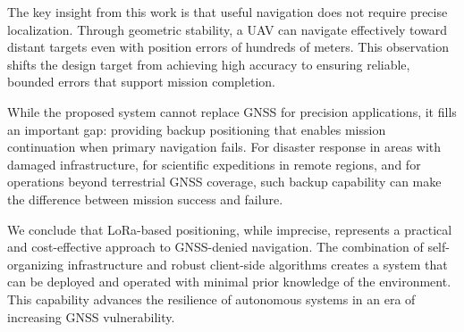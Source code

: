 \documentclass[master,final,11pt]{iscs-thesis}
\begin{document}
The key insight from this work is that useful navigation does not require precise localization.
Through geometric stability, a UAV can navigate effectively toward distant targets even with position errors of hundreds of meters.
This observation shifts the design target from achieving high accuracy to ensuring reliable, bounded errors that support mission completion.

While the proposed system cannot replace GNSS for precision applications, it fills an important gap: providing backup positioning that enables mission continuation when primary navigation fails.
For disaster response in areas with damaged infrastructure, for scientific expeditions in remote regions, and for operations beyond terrestrial GNSS coverage, such backup capability can make the difference between mission success and failure.

We conclude that LoRa-based positioning, while imprecise, represents a practical and cost-effective approach to GNSS-denied navigation.
The combination of self-organizing infrastructure and robust client-side algorithms creates a system that can be deployed and operated with minimal prior knowledge of the environment.
This capability advances the resilience of autonomous systems in an era of increasing GNSS vulnerability.



\end{document}
